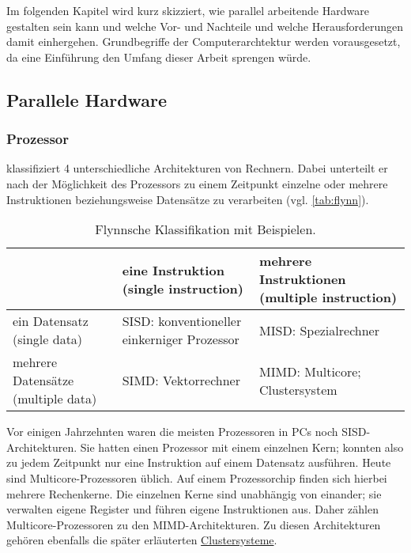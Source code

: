     Im folgenden Kapitel wird kurz skizziert, wie parallel arbeitende Hardware gestalten sein kann und welche Vor- und Nachteile und welche Herausforderungen damit einhergehen. Grundbegriffe
    der Computerarchtektur werden vorausgesetzt, da eine Einführung den Umfang dieser Arbeit sprengen würde.
    
    \subsection{Parallele Hardware}
    \label{sec:parhard}
      \subsubsection{Prozessor}
      \label{sec:processor}
      \citet{flynn} klassifiziert 4 unterschiedliche Architekturen von Rechnern. Dabei unterteilt er nach der Möglichkeit des Prozessors zu einem Zeitpunkt einzelne oder mehrere
      Instruktionen beziehungsweise Datensätze zu verarbeiten (vgl. \autoref{tab:flynn}).
      \begin{table}[tb]
	\centering
	\begin{tabular}{|p{3.5cm}|p{4cm}|p{4cm}|}
	  \hline
			                             & eine Instruktion \newline (single instruction)       & mehrere Instruktionen \newline (multiple instruction) \\
	  \hline
	  ein Datensatz \newline (single data)       & SISD: konventioneller \newline einkerniger Prozessor & MISD: Spezialrechner                                  \\
	  \hline
	  mehrere Datensätze \newline (multiple data)& SIMD: Vektorrechner                                  & MIMD: Multicore; \newline Clustersystem               \\
	  \hline
	\end{tabular}
	\caption{Flynnsche Klassifikation mit Beispielen.}
	\label{tab:flynn}
      \end{table}
      
      Vor einigen Jahrzehnten waren die meisten Prozessoren in PCs noch SISD-Architekturen. Sie hatten einen Prozessor mit einem einzelnen Kern; konnten also zu jedem Zeitpunkt nur eine Instruktion
      auf einem Datensatz ausführen. Heute sind Multicore-Prozessoren üblich. Auf einem Prozessorchip finden sich hierbei mehrere Rechenkerne. Die einzelnen Kerne sind unabhängig von einander; sie 
      verwalten eigene Register und führen eigene Instruktionen aus. Daher zählen Multicore-Prozessoren zu den MIMD-Architekturen. Zu diesen Architekturen gehören ebenfalls die später erläuterten 
      \hyperref[sec:netzwerk]{Clustersysteme}. \citep{flynn, multicore}
      
